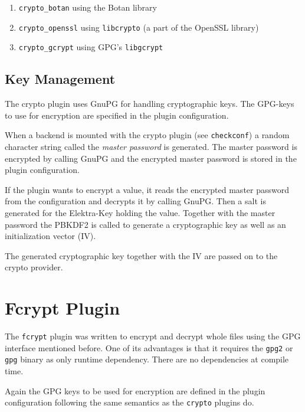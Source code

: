 \begin{enumerate}
\def\labelenumi{\arabic{enumi}.}
\tightlist
\item
  \texttt{crypto\_botan} using the Botan library
\item
  \texttt{crypto\_openssl} using \texttt{libcrypto} (a part of the
  OpenSSL library)
\item
  \texttt{crypto\_gcrypt} using GPG's \texttt{libgcrypt}
\end{enumerate}

\subsection{Key Management}\label{key-management}

The crypto plugin uses GnuPG for handling cryptographic keys. The
GPG-keys to use for encryption are specified in the plugin
configuration.

When a backend is mounted with the crypto plugin (see
\texttt{checkconf}) a random character string called the \emph{master
password} is generated. The master password is encrypted by calling
GnuPG and the encrypted master password is stored in the plugin
configuration.

If the plugin wants to encrypt a value, it reads the encrypted master
password from the configuration and decrypts it by calling GnuPG. Then a
salt is generated for the Elektra-Key holding the value. Together with
the master password the PBKDF2 is called to generate a cryptographic key
as well as an initialization vector (IV).

The generated cryptographic key together with the IV are passed on to
the crypto provider.

\section{Fcrypt Plugin}\label{fcrypt-plugin}

The \texttt{fcrypt} plugin was written to encrypt and decrypt whole
files using the GPG interface mentioned before. One of its advantages is
that it requires the \texttt{gpg2} or \texttt{gpg} binary as only
runtime dependency. There are no dependencies at compile time.

Again the GPG keys to be used for encryption are defined in the plugin
configuration following the same semantics as the \texttt{crypto}
plugins do.
